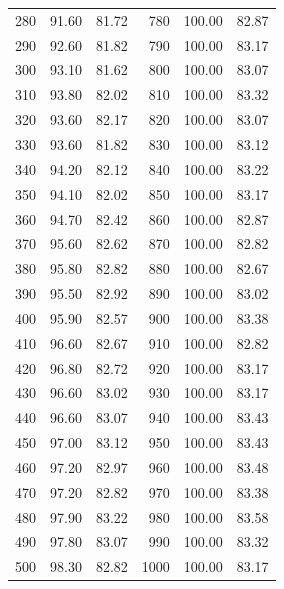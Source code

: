 \documentclass{acm_proc_article-sp}
\begin{document}
\begin{table}[H]
{\begin{tabular}{r r r | r r r}
280 & 91.60 & 81.72 & 780 & 100.00 & 82.87 \\
290 & 92.60 & 81.82 & 790 & 100.00 & 83.17 \\
300 & 93.10 & 81.62 & 800 & 100.00 & 83.07 \\
310 & 93.80 & 82.02 & 810 & 100.00 & 83.32 \\
320 & 93.60 & 82.17 & 820 & 100.00 & 83.07 \\
330 & 93.60 & 81.82 & 830 & 100.00 & 83.12 \\
340 & 94.20 & 82.12 & 840 & 100.00 & 83.22 \\
350 & 94.10 & 82.02 & 850 & 100.00 & 83.17 \\
360 & 94.70 & 82.42 & 860 & 100.00 & 82.87 \\
370 & 95.60 & 82.62 & 870 & 100.00 & 82.82 \\
380 & 95.80 & 82.82 & 880 & 100.00 & 82.67 \\
390 & 95.50 & 82.92 & 890 & 100.00 & 83.02 \\
400 & 95.90 & 82.57 & 900 & 100.00 & 83.38 \\
410 & 96.60 & 82.67 & 910 & 100.00 & 82.82 \\
420 & 96.80 & 82.72 & 920 & 100.00 & 83.17 \\
430 & 96.60 & 83.02 & 930 & 100.00 & 83.17 \\
440 & 96.60 & 83.07 & 940 & 100.00 & 83.43 \\
450 & 97.00 & 83.12 & 950 & 100.00 & 83.43 \\
460 & 97.20 & 82.97 & 960 & 100.00 & 83.48 \\
470 & 97.20 & 82.82 & 970 & 100.00 & 83.38 \\
480 & 97.90 & 83.22 & 980 & 100.00 & 83.58 \\
490 & 97.80 & 83.07 & 990 & 100.00 & 83.32 \\
500 & 98.30 & 82.82 & 1000 & 100.00 & 83.17 \\
\bottomrule
\end{tabular}
}
\end{table}
\end{document}
